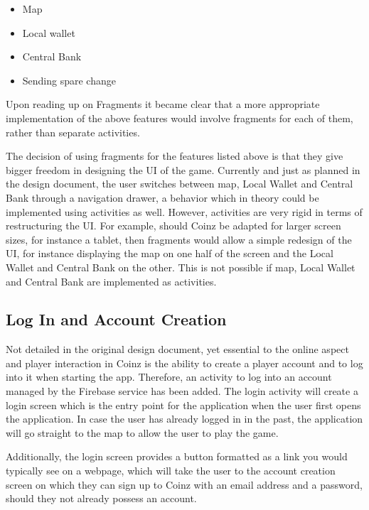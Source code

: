\documentclass[11pt,a4paper,notitlepage]{article}
\begin{document}
    \begin{itemize}
        \item Map
        \item Local wallet
        \item Central Bank
        \item Sending spare change
    \end{itemize}

    Upon reading up on Fragments \cite{fragments} it became clear that a more appropriate implementation of the above features would involve fragments for each of them, rather than separate activities. 

    The decision of using fragments for the features listed above is that they give bigger freedom in designing the UI of the game. Currently and just as planned in the design document, the user switches between map, Local Wallet and Central Bank through a navigation drawer, a behavior which in theory could be implemented using activities as well. However, activities are very rigid in terms of restructuring the UI. For example, should Coinz be adapted for larger screen sizes, for instance a tablet, then fragments would allow a simple redesign of the UI, for instance displaying the map on one half of the screen and the Local Wallet and Central Bank on the other. This is not possible if map, Local Wallet and Central Bank are implemented as activities.

\subsection{Log In and Account Creation}

    Not detailed in the original design document, yet essential to the online aspect and player interaction in Coinz is the ability to create a player account and to log into it when starting the app. Therefore, an activity to log into an account managed by the Firebase service has been added. The login activity will create a login screen which is the entry point for the application when the user first opens the application. In case the user has already logged in in the past, the application will go straight to the map to allow the user to play the game.

    Additionally, the login screen provides a button formatted as a link you would typically see on a webpage, which will take the user to the account creation screen on which they can sign up to Coinz with an email address and a password, should they not already possess an account.
\end{document}
